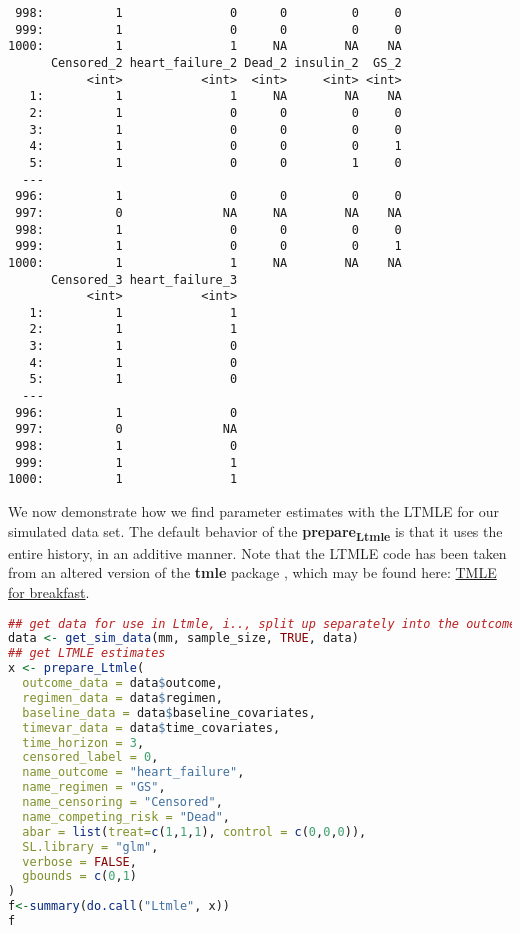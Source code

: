 \documentclass[11pt]{article}
\begin{document}
\begin{verbatim}
 998:          1               0      0         0     0
 999:          1               0      0         0     0
1000:          1               1     NA        NA    NA
      Censored_2 heart_failure_2 Dead_2 insulin_2  GS_2
           <int>           <int>  <int>     <int> <int>
   1:          1               1     NA        NA    NA
   2:          1               0      0         0     0
   3:          1               0      0         0     0
   4:          1               0      0         0     1
   5:          1               0      0         1     0
  ---                                                  
 996:          1               0      0         0     0
 997:          0              NA     NA        NA    NA
 998:          1               0      0         0     0
 999:          1               0      0         0     1
1000:          1               1     NA        NA    NA
      Censored_3 heart_failure_3
           <int>           <int>
   1:          1               1
   2:          1               1
   3:          1               0
   4:          1               0
   5:          1               0
  ---                           
 996:          1               0
 997:          0              NA
 998:          1               0
 999:          1               1
1000:          1               1
\end{verbatim}

We now demonstrate
how we find parameter estimates with the LTMLE
for our simulated data set. The default behavior
of the \textbf{prepare\textsubscript{Ltmle}} is that it uses the entire history,
in an additive manner. Note that the LTMLE
code has been taken from an altered version of the
\textbf{tmle} package \citep{lendleLtmlePackageImplementing2017}, which may be found here: \href{https://github.com/tagteam/TMLE\_for\_breakfast/tree/main}{TMLE for breakfast}.

\begin{lstlisting}[language=r,numbers=none]
## get data for use in Ltmle, i.., split up separately into the outcomes, regimen, baseline covariates and time-varying covariates
data <- get_sim_data(mm, sample_size, TRUE, data)
## get LTMLE estimates
x <- prepare_Ltmle(
  outcome_data = data$outcome,
  regimen_data = data$regimen,
  baseline_data = data$baseline_covariates,
  timevar_data = data$time_covariates,
  time_horizon = 3,
  censored_label = 0,
  name_outcome = "heart_failure",
  name_regimen = "GS",
  name_censoring = "Censored",
  name_competing_risk = "Dead",
  abar = list(treat=c(1,1,1), control = c(0,0,0)),
  SL.library = "glm",
  verbose = FALSE,
  gbounds = c(0,1)
)
f<-summary(do.call("Ltmle", x))
f
\end{lstlisting}
\end{document}
